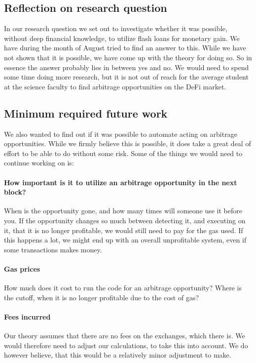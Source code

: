 \subsection{Reflection on research question}
In our research question we set out to investigate whether it was possible,
without deep financial knowledge, to utilize flash loans for monetary gain. We
have during the month of August tried to find an answer to this. While we have
not shown that it is possible, we have come up with the theory for doing so. So
in essence the answer probably lies in between yes and no. We would need to
spend some time doing more research, but it is not out of reach for the average
student at the science faculty to find arbitrage opportunities on the DeFi
market.

\subsection{Minimum required future work}
\noindent We also wanted to find out if it was possible to automate acting on
arbitrage opportunities. While we firmly believe this is possible, it does take
a great deal of effort to be able to do without some risk. Some of the things
we would need to continue working on is:

\paragraph{How important is it to utilize an arbitrage opportunity in the next
block?} When is the opportunity gone, and how many times will someone use it
before you. If the opportunity changes so much between detecting it, and
executing on it, that it is no longer profitable, we would still need to pay for
the gas used. If this happens a lot, we might end up with an overall
unprofitable system, even if some transactions makes money.
\paragraph{Gas prices} How much does it cost to run the code for an arbitrage
opportunity? Where is the cutoff, when it is no longer profitable due to the
cost of gas?
\paragraph{Fees incurred} Our theory assumes that there are no fees on the
exchanges, which there is. We would therefore need to adjust our calculations,
to take this into account. We do however believe, that this would be a
relatively minor adjustment to make.
